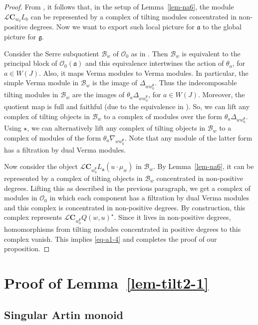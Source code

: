 \documentclass[a4paper]{amsart}
\begin{document}
\begin{proof}
From \cite[Subsection~4.3]{MO2}, it follows that, in the setup 
of Lemma~\ref{lem-na6}, the module $\mathcal{L}\mathbf{C}_{w_0}L_b$
can be represented by a complex of tilting modules concentrated
in non-positive degrees. Now we want to export such local picture 
for $\mathfrak{a}$ to  the global picture for $\mathfrak{g}$.

Consider the Serre subquotient $\mathcal{B}_w$ of $\mathcal{O}_0$
as in \cite[Theorem~37]{CMZ}. Then $\mathcal{B}_w$ is equivalent to
the principal block of $\mathcal{O}_0(\mathfrak{a})$ and this
equivalence intertwines the action of $\theta_a$, for $a\in W(J)$.
Also, it maps Verma modules to Verma modules. In particular, 
the simple Verma module in  $\mathcal{B}_w$ is the image of
$\Delta_{ww_0^\mathfrak{p}}$. Thus the indecomposable 
tilting modules in  $\mathcal{B}_w$ are the images of 
$\theta_a \Delta_{ww_0^\mathfrak{p}}$, for $a\in W(J)$.
Moreover, the quotient map is full and faithful
(due to the equivalence in \cite[Theorem~37]{CMZ}).
So, we can lift any complex of tilting objects in 
$\mathcal{B}_w$ to a complex of modules over the form
$\theta_a \Delta_{ww_0^\mathfrak{p}}$. Using $\star$,
we can alternatively lift any complex of tilting objects in 
$\mathcal{B}_w$ to  a complex of modules
of the form $\theta_a \nabla_{ww_0^\mathfrak{p}}$.
Note that any module of the latter form has a
filtration by dual Verma modules.

Now consider the object 
$\mathcal{L}\mathbf{C}_{w_0^\mathfrak{p}} L_\mathfrak{a}(u\cdot \mu_w)$ in $\mathcal{B}_w$.
By Lemma~\ref{lem-na6}, it can be represented by a 
complex of tilting objects in $\mathcal{B}_w$ concentrated in
non-positive degrees. Lifting this as described in the previous paragraph,
we get a complex of modules in $\mathcal{O}_0$  in which each
component has a filtration by dual Verma
modules and this complex is concentrated in
non-positive degrees. By construction, this complex 
represents $\mathcal{L}\mathbf{C}_{w_0^\mathfrak{p}}Q(w,u)^\star$.
Since it lives in non-positive degrees, homomorphisms from tilting modules
concentrated in positive degrees to this complex vanish. 
This implies \eqref{eq-a1-4}
and completes the proof of our proposition.
\end{proof}


\section{Proof of Lemma~\ref{lem-tilt2-1}}\label{s5}

\subsection{Singular Artin monoid}\label{s5.1}
\end{document}
